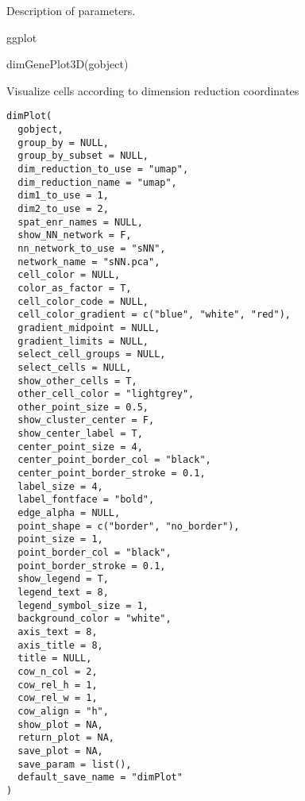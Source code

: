 \documentclass[a4paper]{book}
\begin{document}
%
\begin{Details}\relax
Description of parameters.
\end{Details}
%
\begin{Value}
ggplot
\end{Value}
%
\begin{Examples}
\begin{ExampleCode}
    dimGenePlot3D(gobject)
\end{ExampleCode}
\end{Examples}
%
\begin{Description}\relax
Visualize cells according to dimension reduction coordinates
\end{Description}
%
\begin{Usage}
\begin{verbatim}
dimPlot(
  gobject,
  group_by = NULL,
  group_by_subset = NULL,
  dim_reduction_to_use = "umap",
  dim_reduction_name = "umap",
  dim1_to_use = 1,
  dim2_to_use = 2,
  spat_enr_names = NULL,
  show_NN_network = F,
  nn_network_to_use = "sNN",
  network_name = "sNN.pca",
  cell_color = NULL,
  color_as_factor = T,
  cell_color_code = NULL,
  cell_color_gradient = c("blue", "white", "red"),
  gradient_midpoint = NULL,
  gradient_limits = NULL,
  select_cell_groups = NULL,
  select_cells = NULL,
  show_other_cells = T,
  other_cell_color = "lightgrey",
  other_point_size = 0.5,
  show_cluster_center = F,
  show_center_label = T,
  center_point_size = 4,
  center_point_border_col = "black",
  center_point_border_stroke = 0.1,
  label_size = 4,
  label_fontface = "bold",
  edge_alpha = NULL,
  point_shape = c("border", "no_border"),
  point_size = 1,
  point_border_col = "black",
  point_border_stroke = 0.1,
  show_legend = T,
  legend_text = 8,
  legend_symbol_size = 1,
  background_color = "white",
  axis_text = 8,
  axis_title = 8,
  title = NULL,
  cow_n_col = 2,
  cow_rel_h = 1,
  cow_rel_w = 1,
  cow_align = "h",
  show_plot = NA,
  return_plot = NA,
  save_plot = NA,
  save_param = list(),
  default_save_name = "dimPlot"
)
\end{verbatim}
\end{Usage}
%
\end{document}
